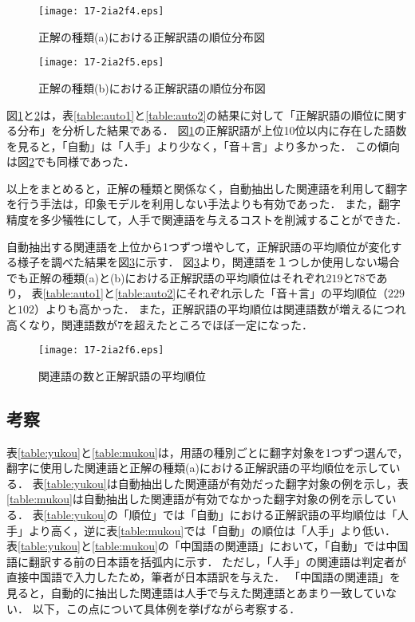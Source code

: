 \documentclass[japanese]{jnlp_1.4}
\begin{document}
{\begin{figure}[b]
\begin{center}
\texttt{[image: 17-2ia2f4.eps]}
\end{center}
 \caption{正解の種類(a)における正解訳語の順位分布図}
 \label{fig:ca1}
\end{figure} 
\begin{figure}[b]
\begin{center}
\texttt{[image: 17-2ia2f5.eps]}
\end{center}
 \caption{正解の種類(b)における正解訳語の順位分布図}
 \label{fig:ca2}
\end{figure}

図\ref{fig:ca1}と\ref{fig:ca2}は，表\ref{table:auto1}と\ref{table:auto2}の結果に対して「正解訳語の順位に関する分布」を分析した結果である．
図\ref{fig:ca1}の正解訳語が上位10位以内に存在した語数を見ると，「自動」は「人手」より少なく，「音＋言」より多かった．
この傾向は図\ref{fig:ca2}でも同様であった．

以上をまとめると，正解の種類と関係なく，自動抽出した関連語を利用して翻字を行う手法は，印象モデルを利用しない手法よりも有効であった．
また，翻字精度を多少犠牲にして，人手で関連語を与えるコストを削減することができた．

自動抽出する関連語を上位から1つずつ増やして，正解訳語の平均順位が変化する様子を調べた結果を図\ref{fig:num}に示す．
図\ref{fig:num}より，関連語を１つしか使用しない場合でも正解の種類(a)と(b)における正解訳語の平均順位はそれぞれ$219$と$78$であり，
表\ref{table:auto1}と\ref{table:auto2}にそれぞれ示した「音＋言」の平均順位（$229$と$102$）よりも高かった．
また，正解訳語の平均順位は関連語数が増えるにつれ高くなり，関連語数が$7$を超えたところでほぼ一定になった．

\begin{figure}[t]
\begin{center}
\texttt{[image: 17-2ia2f6.eps]}
\end{center}
 \caption{関連語の数と正解訳語の平均順位}
 \label{fig:num}
\end{figure}
 


\subsection{考察}\label{sec:kousatu}

表\ref{table:yukou}と\ref{table:mukou}は，用語の種別ごとに翻字対象を1つずつ選んで，翻字に使用した関連語と正解の種類(a)における正解訳語の平均順位を示している．
表\ref{table:yukou}は自動抽出した関連語が有効だった翻字対象の例を示し，表\ref{table:mukou}は自動抽出した関連語が有効でなかった翻字対象の例を示している．
表\ref{table:yukou}の「順位」では「自動」における正解訳語の平均順位は「人手」より高く，逆に表\ref{table:mukou}では「自動」の順位は「人手」より低い．
表\ref{table:yukou}と\ref{table:mukou}の「中国語の関連語」において，「自動」では中国語に翻訳する前の日本語を括弧内に示す．
ただし，「人手」の関連語は判定者が直接中国語で入力したため，筆者が日本語訳を与えた．
「中国語の関連語」を見ると，自動的に抽出した関連語は人手で与えた関連語とあまり一致していない．
以下，この点について具体例を挙げながら考察する．

}
\end{document}
